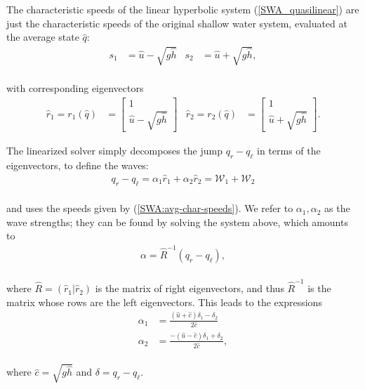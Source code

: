 \documentclass{SIAMbook2016}
\begin{document}
The characteristic speeds of the linear hyperbolic system
(\ref{SWA_quasilinear}) are just the characteristic speeds of the
original shallow water system, evaluated at the average state
\(\hat{q}\):\\
\begin{align} \label{SWA:avg-char-speeds}
    s_1 & = \hat{u} - \sqrt{g\hat{h}} & s_2 & = \hat{u} + \sqrt{g\hat{h}},
\end{align}\\
with corresponding eigenvectors\\
\begin{align} \label{SWA:avg-fjac-evecs}
    \hat{r}_1 = r_1(\hat{q}) & = \begin{bmatrix} 1 \\ \hat{u}-\sqrt{g\hat{h}} \end{bmatrix} &
    \hat{r}_2 = r_2(\hat{q}) & = \begin{bmatrix} 1 \\ \hat{u}+\sqrt{g\hat{h}} \end{bmatrix}.
\end{align}

The linearized solver simply decomposes the jump \(q_r-q_\ell\) in terms
of the eigenvectors, to define the waves:\\
\begin{align} \label{SWA:wave-decomp}
q_r - q_\ell = \alpha_1 \hat{r}_1 + \alpha_2 \hat{r}_2 = {\mathcal W}_1 + {\mathcal W}_2
\end{align}\\
and uses the speeds given by (\ref{SWA:avg-char-speeds}). We refer to
\(\alpha_1, \alpha_2\) as the wave strengths; they can be found by
solving the system above, which amounts to\\
\begin{align}
\alpha = \hat{R}^{-1}(q_r-q_\ell),
\end{align}\\
where \(\hat{R} = (\hat{r}_1 | \hat{r}_2)\) is the matrix of right
eigenvectors, and thus \(\hat{R}^{-1}\) is the matrix whose rows are the
left eigenvectors. This leads to the expressions\\
\begin{align}
\alpha_1 & = \frac{(\hat{u}+ \hat{c}) \delta_1 - \delta_2}{2\hat{c}} \\
\alpha_2 & = \frac{-(\hat{u} - \hat{c}) \delta_1 + \delta_2}{2\hat{c}},
\end{align}\\
where \(\hat{c} = \sqrt{g\hat{h}}\) and \(\delta = q_r -q_\ell\).
\end{document}
